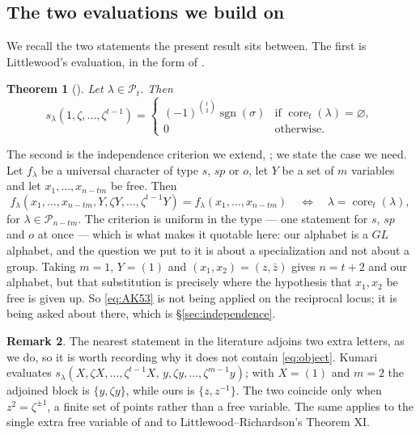 \documentclass[11pt,reqno]{amsart}
\theoremstyle{plain}
\newtheorem{theorem}{Theorem}[section]
\theoremstyle{definition}
\newtheorem{remark}[theorem]{Remark}
\newcommand{\PP}{\mathcal{P}}
\newcommand{\sgn}{\operatorname{sgn}}
\newcommand{\core}{\operatorname{core}}
\newcommand{\zb}{\bar z}
\begin{document}
\subsection{The two evaluations we build on}
We recall the two statements the present result sits between. The first is Littlewood's evaluation,
in the form of \cite[Theorem 2.2]{AK25}.

\begin{theorem}[{\cite[Theorem IX]{LR34}}]\label{thm:LR}
Let $\lambda\in\PP_t$. Then
\[
s_\lambda(1,\zeta,\dots,\zeta^{t-1})=
\begin{cases}
(-1)^{\binom{t}{2}}\sgn(\sigma) & \text{if }\core_t(\lambda)=\varnothing,\\
0 & \text{otherwise.}
\end{cases}
\]
\end{theorem}

The second is the independence criterion we extend, \cite[Theorem 5.3]{AK25}; we state the case we
need. Let $f_\lambda$ be a universal character of type $s$, $sp$ or $o$, let $Y$ be a set of $m$
variables and let $x_1,\dots,x_{n-tm}$ be free. Then
\begin{equation}\label{eq:AK53}
f_\lambda(x_1,\dots,x_{n-tm},Y,\zeta Y,\dots,\zeta^{t-1}Y)=f_\lambda(x_1,\dots,x_{n-tm})
\quad\Longleftrightarrow\quad \lambda=\core_t(\lambda),
\end{equation}
for $\lambda\in\PP_{n-tm}$. The criterion is uniform in the type --- one statement for $s$, $sp$ and
$o$ at once --- which is what makes it quotable here: our alphabet is a $GL$ alphabet, and the
question we put to it is about a specialization and not about a group. Taking $m=1$, $Y=(1)$ and
$(x_1,x_2)=(z,\zb)$ gives $n=t+2$ and our alphabet, but that substitution is precisely where the
hypothesis that $x_1,x_2$ be free is given up. So \eqref{eq:AK53} is not being applied on the
reciprocal locus; it is being asked about there, which is \S\ref{sec:independence}.

\begin{remark}\label{rem:notacase}
The nearest statement in the literature adjoins two extra letters, as we do, so it is worth recording
why it does not contain \eqref{eq:object}. Kumari \cite[Theorem 2.2]{Kum24} evaluates
$s_\lambda(X,\zeta X,\dots,\zeta^{t-1}X,\,y,\zeta y,\dots,\zeta^{m-1}y)$; with $X=(1)$ and $m=2$ the
adjoined block is $\{y,\zeta y\}$, while ours is $\{z,z^{-1}\}$. The two coincide only when
$z^{2}=\zeta^{\pm1}$, a finite set of points rather than a free variable. The same applies to the
single extra free variable of \cite[Theorem 2.7]{AK22} and to Littlewood--Richardson's Theorem XI.
\end{remark}
\end{document}
